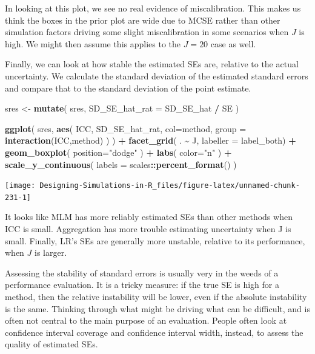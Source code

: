 \documentclass[
]{book}
\newenvironment{Shaded}{\begin{snugshade}}{\end{snugshade}}
\newcommand{\AttributeTok}[1]{\textcolor[rgb]{0.13,0.29,0.53}{#1}}
\newcommand{\FunctionTok}[1]{\textcolor[rgb]{0.13,0.29,0.53}{\textbf{#1}}}
\newcommand{\NormalTok}[1]{#1}
\newcommand{\OtherTok}[1]{\textcolor[rgb]{0.56,0.35,0.01}{#1}}
\newcommand{\SpecialCharTok}[1]{\textcolor[rgb]{0.81,0.36,0.00}{\textbf{#1}}}
\newcommand{\StringTok}[1]{\textcolor[rgb]{0.31,0.60,0.02}{#1}}
\begin{document}
In looking at this plot, we see no real evidence of miscalibration.
This makes us think the boxes in the prior plot are wide due to MCSE rather than other simulation factors driving some slight miscalibration in some scenarios when \(J\) is high.
We might then assume this applies to the \(J = 20\) case as well.

Finally, we can look at how stable the estimated SEs are, relative to the actual uncertainty.
We calculate the standard deviation of the estimated standard errors and compare that to the standard deviation of the point estimate.

\begin{Shaded}
\begin{Highlighting}[]
\NormalTok{sres }\OtherTok{\textless{}{-}} \FunctionTok{mutate}\NormalTok{( sres,}
               \AttributeTok{SD\_SE\_hat\_rat =}\NormalTok{ SD\_SE\_hat }\SpecialCharTok{/}\NormalTok{ SE )}

\FunctionTok{ggplot}\NormalTok{( sres,}
        \FunctionTok{aes}\NormalTok{( ICC, SD\_SE\_hat\_rat, }\AttributeTok{col=}\NormalTok{method,}
             \AttributeTok{group =} \FunctionTok{interaction}\NormalTok{(ICC,method) ) ) }\SpecialCharTok{+}
    \FunctionTok{facet\_grid}\NormalTok{( . }\SpecialCharTok{\textasciitilde{}}\NormalTok{ J, }\AttributeTok{labeller =}\NormalTok{ label\_both) }\SpecialCharTok{+}
  \FunctionTok{geom\_boxplot}\NormalTok{( }\AttributeTok{position=}\StringTok{"dodge"}\NormalTok{ ) }\SpecialCharTok{+}
  \FunctionTok{labs}\NormalTok{( }\AttributeTok{color=}\StringTok{"n"}\NormalTok{ ) }\SpecialCharTok{+}
  \FunctionTok{scale\_y\_continuous}\NormalTok{( }\AttributeTok{labels =}\NormalTok{ scales}\SpecialCharTok{::}\FunctionTok{percent\_format}\NormalTok{() ) }
\end{Highlighting}
\end{Shaded}

\begin{center}\texttt{[image: Designing-Simulations-in-R\_files/figure-latex/unnamed-chunk-231-1]} \end{center}

It looks like MLM has more reliably estimated SEs than other methods when ICC is small.
Aggregation has more trouble estimating uncertainty when J is small.
Finally, LR's SEs are generally more unstable, relative to its performance, when \(J\) is larger.

Assessing the stability of standard errors is usually very in the weeds of a performance evaluation.
It is a tricky measure: if the true SE is high for a method, then the relative instability will be lower, even if the absolute instability is the same.
Thinking through what might be driving what can be difficult, and is often not central to the main purpose of an evaluation.
People often look at confidence interval coverage and confidence interval width, instead, to assess the quality of estimated SEs.
\end{document}

